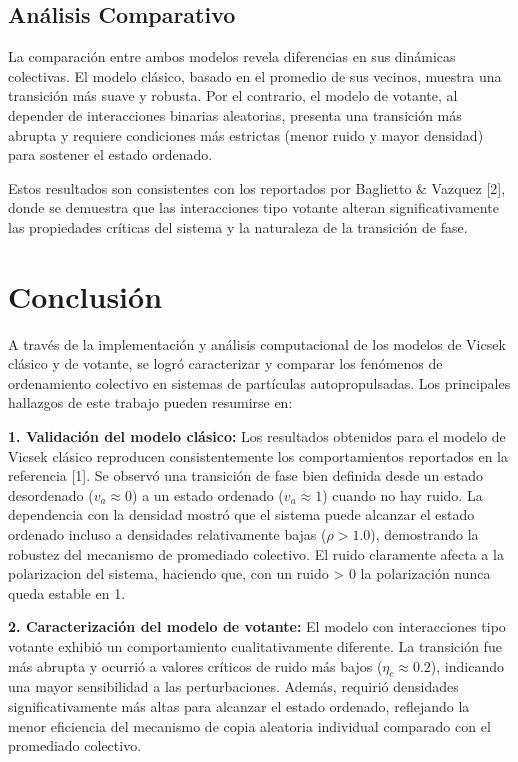 \documentclass{article}
\begin{document}
\subsection{Análisis Comparativo}
La comparación entre ambos modelos revela diferencias en sus dinámicas colectivas. El modelo clásico, basado en el promedio de sus vecinos, muestra una transición más suave y robusta. Por el contrario, el modelo de votante, al depender de interacciones binarias aleatorias, presenta una transición más abrupta y requiere condiciones más estrictas (menor ruido y mayor densidad) para sostener el estado ordenado.

Estos resultados son consistentes con los reportados por Baglietto \& Vazquez [2], donde se demuestra que las interacciones tipo votante alteran significativamente las propiedades críticas del sistema y la naturaleza de la transición de fase.

\section{Conclusión}

A través de la implementación y análisis computacional de los modelos de Vicsek clásico y de votante, se logró caracterizar y comparar los fenómenos de ordenamiento colectivo en sistemas de partículas autopropulsadas. Los principales hallazgos de este trabajo pueden resumirse en:

\medskip

\textbf{1. Validación del modelo clásico:} Los resultados obtenidos para el modelo de Vicsek clásico reproducen consistentemente los comportamientos reportados en la referencia [1]. Se observó una transición de fase bien definida desde un estado desordenado ($v_a \approx 0$) a un estado ordenado ($v_a \approx 1$) cuando no hay ruido. La dependencia con la densidad mostró que el sistema puede alcanzar el estado ordenado incluso a densidades relativamente bajas ($\rho > 1.0$), demostrando la robustez del mecanismo de promediado colectivo. El ruido claramente afecta a la polarizacion del sistema, haciendo que, con un ruido > 0 la polarización nunca queda estable en 1.

\medskip

\textbf{2. Caracterización del modelo de votante:} El modelo con interacciones tipo votante exhibió un comportamiento cualitativamente diferente. La transición fue más abrupta y ocurrió a valores críticos de ruido más bajos ($\eta_c \approx 0.2$), indicando una mayor sensibilidad a las perturbaciones. Además, requirió densidades significativamente más altas para alcanzar el estado ordenado, reflejando la menor eficiencia del mecanismo de copia aleatoria individual comparado con el promediado colectivo.
\end{document}
